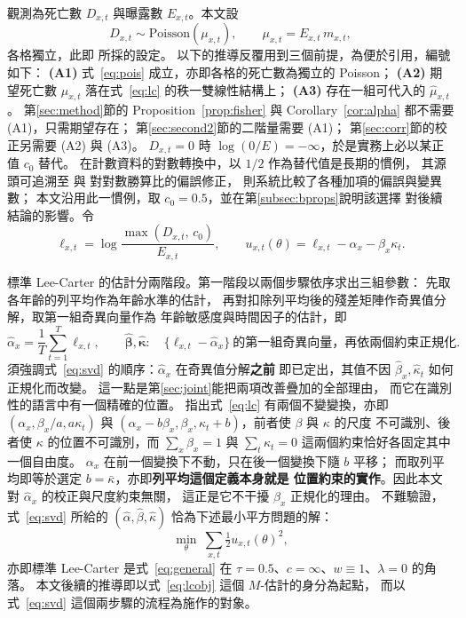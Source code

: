 \documentclass[UTF8, fontset=macnew, a4paper, 12pt]{ctexart}
\begin{document}
觀測為死亡數 $D_{x,t}$ 與曝露數 $E_{x,t}$。本文設
\begin{equation}\label{eq:pois}
D_{x,t}\sim\text{Poisson}(\mu_{x,t}),\qquad \mu_{x,t}=E_{x,t}\,m_{x,t},
\end{equation}
各格獨立，此即 \citet{brouhns2002}所採的設定。
以下的推導反覆用到三個前提，為便於引用，編號如下：
\textbf{(A1)} 式~\eqref{eq:pois} 成立，亦即各格的死亡數為獨立的 Poisson；
\textbf{(A2)} 期望死亡數 $\mu_{x,t}$ 落在式~\eqref{eq:lc} 的秩一雙線性結構上；
\textbf{(A3)} 存在一組可代入的 $\hat\mu_{x,t}$。
第\ref{sec:method}節的 Proposition~\ref{prop:fisher} 與
Corollary~\ref{cor:alpha} 都不需要 (A1)，只需期望存在；
第\ref{sec:second2}節的二階量需要 (A1)；
第\ref{sec:corr}節的校正另需要 (A2) 與 (A3)。
$D_{x,t}=0$ 時 $\log(0/E)=-\infty$，於是實務上必以某正值 $c_0$ 替代。
在計數資料的對數轉換中，以 $1/2$ 作為替代值是長期的慣例，
其源頭可追溯至 \citet{haldane1956}與 \citet{anscombe1956}對對數勝算比的偏誤修正，
\citet{gart1967}則系統比較了各種加項的偏誤與變異數；
本文沿用此一慣例，取 $c_0=0.5$，並在第\ref{subsec:bprops}說明該選擇
對後續結論的影響。令
\begin{equation}\label{eq:ell}
\ell_{x,t}=\log\frac{\max(D_{x,t},\,c_0)}{E_{x,t}},\qquad
u_{x,t}(\theta)=\ell_{x,t}-\alpha_x-\beta_x\kappa_t .
\end{equation}

標準 Lee-Carter 的估計分兩階段。第一階段以兩個步驟依序求出三組參數：
先取各年齡的列平均作為年齡水準的估計，
再對扣除列平均後的殘差矩陣作奇異值分解，取第一組奇異向量作為
年齡敏感度與時間因子的估計，即
\begin{equation}\label{eq:svd}
\hat\alpha_x=\frac1T\sum_{t=1}^{T}\ell_{x,t},\qquad
\hat{\boldsymbol\beta},\hat{\boldsymbol\kappa}:\quad
\{\ell_{x,t}-\hat\alpha_x\}\ \text{的第一組奇異向量，再依兩個約束正規化} .
\end{equation}
須強調式~\eqref{eq:svd} 的順序：$\hat\alpha_x$ 在奇異值分解\textbf{之前}
即已定出，其值不因 $\hat\beta_x,\hat\kappa_t$ 如何正規化而改變。
這一點是第\ref{sec:joint}能把兩項改善疊加的全部理由，
而它在識別性的語言中有一個精確的位置。\citet{hunt2020} 指出式~\eqref{eq:lc}
有兩個不變變換，亦即 $(\alpha_x,\beta_x/a,a\kappa_t)$ 與
$(\alpha_x-b\beta_x,\beta_x,\kappa_t+b)$，前者使 $\beta$ 與 $\kappa$ 的尺度
不可識別、後者使 $\kappa$ 的位置不可識別，而 $\sum_x\beta_x=1$ 與
$\sum_t\kappa_t=0$ 這兩個約束恰好各固定其中一個自由度。
$\alpha_x$ 在前一個變換下不動，只在後一個變換下隨 $b$ 平移；
而取列平均即等於選定 $b=\bar\kappa$，亦即\textbf{列平均這個定義本身就是
位置約束的實作}。因此本文對 $\hat\alpha_x$ 的校正與尺度約束無關，
這正是它不干擾 $\hat\beta_x$ 正規化的理由。
不難驗證，式~\eqref{eq:svd} 所給的 $(\hat\alpha,\hat\beta,\hat\kappa)$
恰為下述最小平方問題的解：
\begin{equation}\label{eq:lcobj}
\min_{\theta}\ \sum_{x,t}\tfrac12 u_{x,t}(\theta)^2 ,
\end{equation}
亦即標準 Lee-Carter 是式~\eqref{eq:general} 在
$\tau=0.5$、$c=\infty$、$w\equiv1$、$\lambda=0$ 的角落。
本文後續的推導即以式~\eqref{eq:lcobj} 這個 $M$-估計的身分為起點，
而以式~\eqref{eq:svd} 這個兩步驟的流程為施作的對象。
\end{document}
